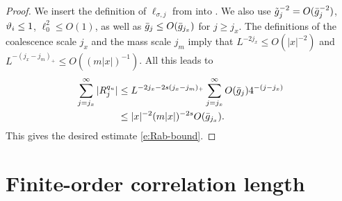 \begin{proof}
We insert the definition of $\ell_{\sigma,j}$ from  into .
We also use $\tilde{g}_j^{-2} = O(\bar{g}_j^{-2})$, $\vartheta_i \le 1$, $\ell_0^2 \le O(1)$,
as well as $\bar{g}_{j} \leq O(\bar{g}_{j_{x}})$ for $j \geq j_x$.
The definitions of
the coalescence scale $j_x$ and the mass scale $j_m$ imply that  $L^{-2j_x} \le O(|x|^{-2})$
and $L^{ -  (j_{x} - j_m)_+} \le O((m|x|)^{-1})$.
All this leads to
\begin{align}
\sum_{j = j_{x}}^\infty |R^{q_u}_j|
&\leq
L^{-2j_{x} - 2s (j_{x} - j_m)_+}
\sum_{j = j_{x}}^\infty O(\bar{g}_{j}) 4^{-(j - j_{x})}
\nonumber \\
&\leq
|x|^{-2} (m|x|)^{-2s} O(\bar{g}_{j_{x}})
.
\label{e:vq-sum}
\end{align}
This gives the desired estimate \eqref{e:Rab-bound}.
\end{proof}


\section{Finite-order correlation length}

